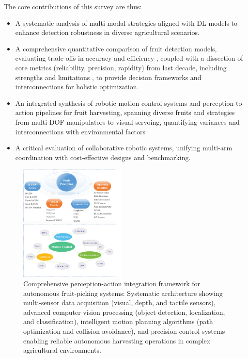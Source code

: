 \documentclass[a4paper,fleqn]{cas-dc}
\begin{document}
The core contributions of this survey are thus:
\begin{itemize}
\item A systematic analysis of multi-modal strategies aligned with DL models to enhance detection robustness in diverse agricultural scenarios.

\item A comprehensive quantitative comparison of fruit detection models, evaluating trade-offs in accuracy 
 and efficiency 
, coupled with a dissection of core metrics (reliability, precision, rapidity) from last decade, including strengths 
and limitations 
, to provide decision frameworks and interconnections for holistic optimization.

\item An integrated synthesis of robotic motion control systems and perception-to-action pipelines for fruit harvesting, spanning diverse fruits and strategies from multi-DOF manipulators to visual servoing, quantifying variances 
and interconnections with environmental factors

\item A critical evaluation of collaborative robotic systems, unifying multi-arm coordination with cost-effective designs and benchmarking.
\end{itemize}

\begin{figure}[h!]
    \centering
    \includegraphics[width=0.48\textwidth]{fig_struct2.png}
    \caption{Comprehensive perception-action integration framework for autonomous fruit-picking systems: Systematic architecture showing multi-sensor data acquisition (visual, depth, and tactile sensors), advanced computer vision processing (object detection, localization, and classification), intelligent motion planning algorithms (path optimization and collision avoidance), and precision control systems enabling reliable autonomous harvesting operations in complex agricultural environments.}
    \label{fig:struct}
\end{figure}
\end{document}

